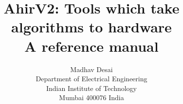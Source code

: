 
\documentclass[12pt]{article}
\usepackage{epsfig}
\usepackage{graphics}

\title{AhirV2: Tools which take algorithms to hardware \\ A reference manual }
\author{Madhav Desai \\ Department of Electrical Engineering \\ Indian Institute of Technology \\
	Mumbai 400076 India}

\newcommand{\Aa}{{\bf Aa}~}
\newcommand{\vC}{{\bf vC}~}


\maketitle

\section{What is AhirV2?}

AhirV2 is a set of tools which can convert a C 
description of a system to  an equivalent hardware
implementation (described in VHDL).  Using these tools,
it is possible to take an algorithmic approach to 
the design of  hardware.

The flow of transformations is illustrated in Figure \ref{fig:AhirFlow}.
\begin{figure}
\centering
\texttt{[image: AHIRv2Flow.pdf]}
\caption{AhirV2 flow}
 \label{fig:AhirFlow}
\end{figure}

